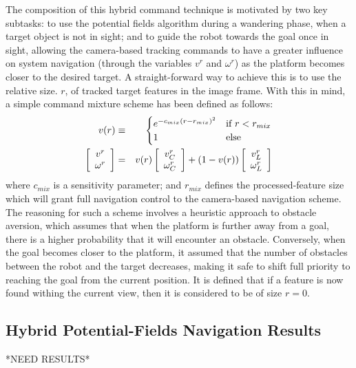 			The composition of this hybrid command technique is motivated by two key subtasks: to use the potential fields algorithm during a wandering phase, when a target object is not in sight; and to guide the robot towards the goal once in sight, allowing the camera-based tracking commands to have a greater influence on system navigation (through the variables $v^{r}$ and $\omega^{r}$) as the platform becomes closer to the desired target. A straight-forward way to achieve this is to use the relative size. $r$, of tracked target features in the image frame. With this in mind, a simple command mixture scheme has been defined as follows:
			\begin{eqnarray}
				v(r) &\equiv&
				\begin{cases}
				e^{ -c_{mix} \left( r - r_{mix}\right)^{2} } 	& \text{if } r < r_{mix}	\\
				1											& \text{else}
				\end{cases}
								\nonumber \\
						\left[\begin{array}{c} v^{r} 	\\ \omega^{r} 		\end{array} \right] &=& 	
				v(r)	\left[\begin{array}{c} v^{r}_{C}\\ \omega^{r}_{C} 	\end{array} \right] + 
				(1-v(r))\left[\begin{array}{c} v^{r}_{L}\\ \omega^{r}_{L} 	\end{array} \right] 
			\end{eqnarray}
			where $c_{mix}$ is a sensitivity parameter; and $r_{mix}$ defines the processed-feature size which will grant full navigation control to the camera-based navigation scheme. The reasoning for such a scheme involves a heuristic approach to obstacle aversion, which assumes that when the platform is further away from a goal, there is a higher probability that it will encounter an obstacle. Conversely, when the goal becomes closer to the platform, it assumed that the number of obstacles between the robot and the target decreases, making it safe to shift full priority to reaching the goal from the current position. It is defined that if a feature is now found withing the current view, then it is considered to be of size $r=0$.

		\subsection{Hybrid Potential-Fields Navigation Results}
		*NEED RESULTS*



